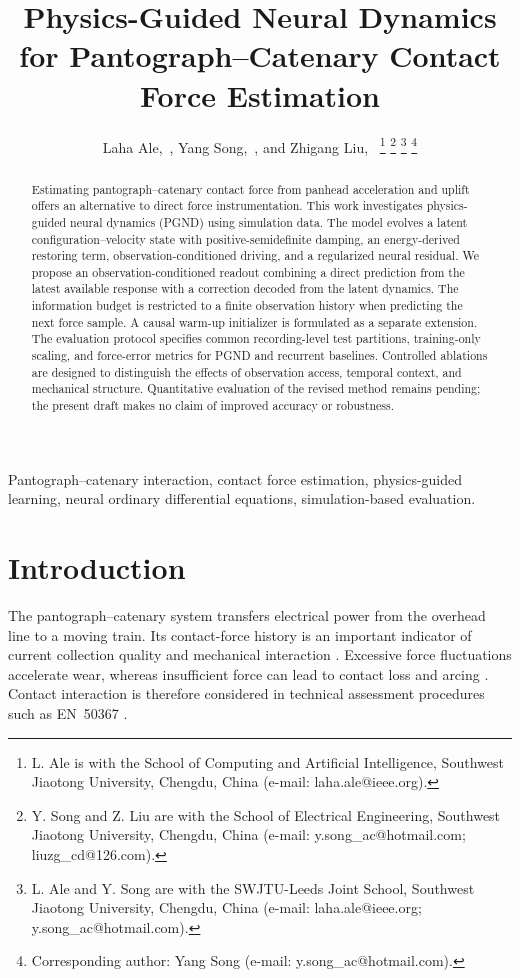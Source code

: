 \documentclass[journal,twoside]{IEEEtran}
\title{Physics-Guided Neural Dynamics for Pantograph--Catenary Contact Force Estimation}
\author{Laha Ale,~\IEEEmembership{Senior~Member,~IEEE},
Yang Song,~\IEEEmembership{Senior~Member,~IEEE},
and Zhigang Liu,~\IEEEmembership{Life~Fellow,~IEEE}
\thanks{L. Ale is with the School of Computing and Artificial Intelligence,
Southwest Jiaotong University, Chengdu, China (e-mail: laha.ale@ieee.org).}
\thanks{Y. Song and Z. Liu are with the School of Electrical Engineering,
Southwest Jiaotong University, Chengdu, China (e-mail:
y.song\_ac@hotmail.com; liuzg\_cd@126.com).}
\thanks{L. Ale and Y. Song are with the SWJTU-Leeds Joint School,
Southwest Jiaotong University, Chengdu, China (e-mail:
laha.ale@ieee.org; y.song\_ac@hotmail.com).}
\thanks{Corresponding author: Yang Song (e-mail: y.song\_ac@hotmail.com).}}
\begin{document}
\maketitle

\begin{abstract}
Estimating pantograph--catenary contact force from panhead acceleration and
uplift offers an alternative to direct force instrumentation. This work
investigates physics-guided neural dynamics (PGND) using simulation data.
The model evolves a latent configuration--velocity state with
positive-semidefinite damping, an energy-derived restoring term,
observation-conditioned driving, and a regularized neural residual.
We propose an observation-conditioned readout combining a direct prediction
from the latest available response with a correction decoded from the
latent dynamics. The information budget is restricted to a finite
observation history when predicting the next force sample. A causal warm-up
initializer is formulated as a separate extension. The evaluation protocol
specifies common recording-level test partitions, training-only scaling,
and force-error metrics for PGND and recurrent baselines. Controlled
ablations are designed to distinguish the effects of observation access,
temporal context, and mechanical structure. Quantitative evaluation of the
revised method remains pending; the present draft makes no claim of
improved accuracy or robustness.
\end{abstract}

\begin{IEEEkeywords}
Pantograph--catenary interaction, contact force estimation,
physics-guided learning, neural ordinary differential equations,
simulation-based evaluation.
\end{IEEEkeywords}
\IEEEpeerreviewmaketitle
\thispagestyle{plain}
\pagestyle{plain}

\section{Introduction}
\label{sec_intro}

The pantograph--catenary system transfers electrical power from the overhead
line to a moving train. Its contact-force history is an important indicator
of current collection quality and mechanical interaction
\cite{liu2024review,bruni2018interaction,navik2017variation}.
Excessive force fluctuations accelerate wear, whereas insufficient force
can lead to contact loss and arcing \cite{bruni2018interaction}.
Contact interaction is therefore considered in technical assessment
procedures such as EN~50367 \cite{en50367_2020}.
\end{document}
